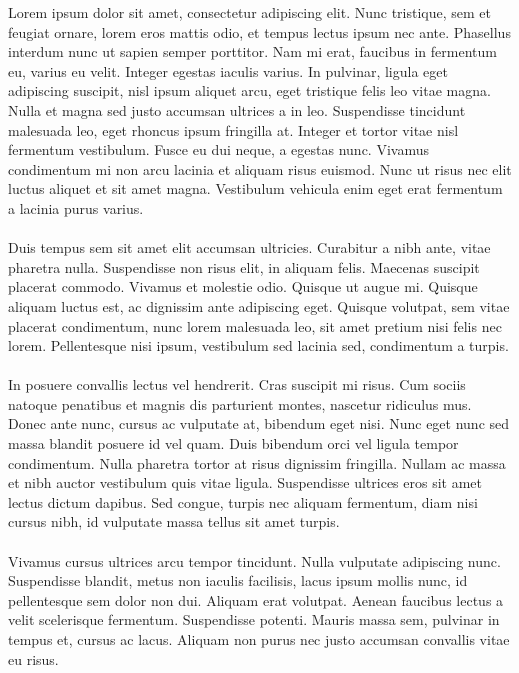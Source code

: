 Lorem ipsum dolor sit amet, consectetur adipiscing elit. Nunc tristique, sem et feugiat ornare, lorem eros mattis odio, et tempus lectus ipsum nec ante. Phasellus interdum nunc ut sapien semper porttitor. Nam mi erat, faucibus in fermentum eu, varius eu velit. Integer egestas iaculis varius. In pulvinar, ligula eget adipiscing suscipit, nisl ipsum aliquet arcu, eget tristique felis leo vitae magna. Nulla et magna sed justo accumsan ultrices a in leo. Suspendisse tincidunt malesuada leo, eget rhoncus ipsum fringilla at. Integer et tortor vitae nisl fermentum vestibulum. Fusce eu dui neque, a egestas nunc. Vivamus condimentum mi non arcu lacinia et aliquam risus euismod. Nunc ut risus nec elit luctus aliquet et sit amet magna. Vestibulum vehicula enim eget erat fermentum a lacinia purus varius.

\paragraph{}
Duis tempus sem sit amet elit accumsan ultricies. Curabitur a nibh ante, vitae pharetra nulla. Suspendisse non risus elit, in aliquam felis. Maecenas suscipit placerat commodo. Vivamus et molestie odio. Quisque ut augue mi. Quisque aliquam luctus est, ac dignissim ante adipiscing eget. Quisque volutpat, sem vitae placerat condimentum, nunc lorem malesuada leo, sit amet pretium nisi felis nec lorem. Pellentesque nisi ipsum, vestibulum sed lacinia sed, condimentum a turpis.

\paragraph{}
In posuere convallis lectus vel hendrerit. Cras suscipit mi risus. Cum sociis natoque penatibus et magnis dis parturient montes, nascetur ridiculus mus. Donec ante nunc, cursus ac vulputate at, bibendum eget nisi. Nunc eget nunc sed massa blandit posuere id vel quam. Duis bibendum orci vel ligula tempor condimentum. Nulla pharetra tortor at risus dignissim fringilla. Nullam ac massa et nibh auctor vestibulum quis vitae ligula. Suspendisse ultrices eros sit amet lectus dictum dapibus. Sed congue, turpis nec aliquam fermentum, diam nisi cursus nibh, id vulputate massa tellus sit amet turpis.

\paragraph{}
Vivamus cursus ultrices arcu tempor tincidunt. Nulla vulputate adipiscing nunc. Suspendisse blandit, metus non iaculis facilisis, lacus ipsum mollis nunc, id pellentesque sem dolor non dui. Aliquam erat volutpat. Aenean faucibus lectus a velit scelerisque fermentum. Suspendisse potenti. Mauris massa sem, pulvinar in tempus et, cursus ac lacus. Aliquam non purus nec justo accumsan convallis vitae eu risus.

